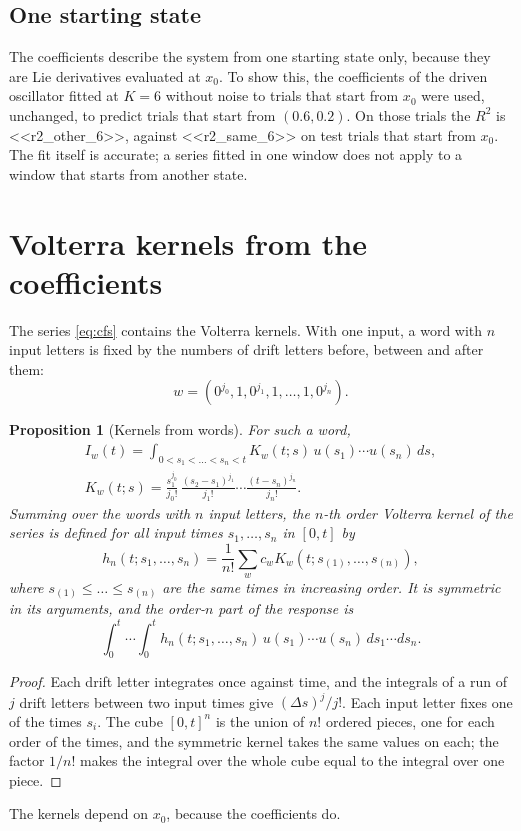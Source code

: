 \documentclass[11pt,a4paper]{article}
\newtheorem{proposition}{Proposition}
\theoremstyle{remark}
\begin{document}
\subsection{One starting state}
The coefficients describe the system from one starting state only, because they are Lie derivatives evaluated at $x_0$.
To show this, the coefficients of the driven oscillator fitted at $K=6$ without noise to trials that start from $x_0$ were used, unchanged, to predict trials that start from $(0.6,0.2)$.
On those trials the $R^2$ is <<r2_other_6>>, against <<r2_same_6>> on test trials that start from $x_0$.
The fit itself is accurate; a series fitted in one window does not apply to a window that starts from another state.

\section{Volterra kernels from the coefficients}\label{sec:kernels}
The series \eqref{eq:cfs} contains the Volterra kernels.
With one input, a word with $n$ input letters is fixed by the numbers of drift letters before, between and after them:
\[w=(0^{j_0},1,0^{j_1},1,\dots,1,0^{j_n}).\]
\begin{proposition}[Kernels from words]\label{prop:kernel}
For such a word,
\begin{gather*}
I_w(t)=\int_{0<s_1<\dots<s_n<t}K_w(t;s)\,u(s_1)\cdots u(s_n)\,ds,\\
K_w(t;s)=\frac{s_1^{j_0}}{j_0!}\,\frac{(s_2-s_1)^{j_1}}{j_1!}\cdots\frac{(t-s_n)^{j_n}}{j_n!} .
\end{gather*}
Summing over the words with $n$ input letters, the $n$-th order Volterra kernel of the series is defined for all input times $s_1,\dots,s_n$ in $[0,t]$ by
\[h_n(t;s_1,\dots,s_n)=\frac1{n!}\sum_wc_wK_w(t;s_{(1)},\dots,s_{(n)}),\]
where $s_{(1)}\le\dots\le s_{(n)}$ are the same times in increasing order.
It is symmetric in its arguments, and the order-$n$ part of the response is
\[\int_0^t\!\!\cdots\!\int_0^th_n(t;s_1,\dots,s_n)\,u(s_1)\cdots u(s_n)\,ds_1\cdots ds_n .\]
\end{proposition}
\begin{proof}
Each drift letter integrates once against time, and the integrals of a run of $j$ drift letters between two input times give $(\Delta s)^j/j!$.
Each input letter fixes one of the times $s_i$.
The cube $[0,t]^n$ is the union of $n!$ ordered pieces, one for each order of the times, and the symmetric kernel takes the same values on each; the factor $1/n!$ makes the integral over the whole cube equal to the integral over one piece.
\end{proof}
The kernels depend on $x_0$, because the coefficients do.
\end{document}
